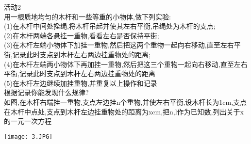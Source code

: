 \documentclass[11pt,apaper]{article}
\begin{document}
\begin{framed}
活动2\\

用一根质地均匀的木杆和一些等重的小物体,做下列实验:\\
(1)在木杆中间处拴绳,将木杆吊起并使其左右平衡,吊绳处为木杆的支点;\\
(2)在木杆两端各悬挂一重物,看看左右是否保持平街;\\
(3)在木杆左端小物体下加挂一重物,然后把这两个重物一起向右移动,直至左右平街,记录此时支点到木杆左右两边挂重物处的距离;\\
(4)在木杆左端两小物体下再加挂一重物,然后把这三个重物一起向右移动,直至左右平街,记录此时支点到木杆左右两边挂重物处的距离\\
(5)在木杆左边继续加挂重物,并重复以上操作和记录\\
根据记录你能发现什么规律?\\
如图,在木杆右端挂一重物,支点左边挂n个重物,并使左右平衡,设木杆长为1cm,支点在木杆中点处,支点到木杆左边挂重物处的距离为xcm,把n,l作为已知数,列出关于x的一元一次方程\\
\begin{center}
  \texttt{[image: 3.JPG]}\\
\end{center}
\end{framed}
\end{document}
